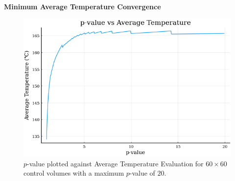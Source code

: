 \documentclass[final]{beamer}
\begin{document}
\begin{frame}{\textbf{Minimum Average Temperature Convergence}}
	\begin{figure}
		\centering
		\includegraphics[width=0.9\linewidth]{60x60-p_vs_T.png}
		\caption[$p$-value vs. $T_{av}$]{$p$-value plotted against Average Temperature Evaluation for $60\times 60$ control volumes with a maximum $p$-value of $20$.}
		\label{fig:p-vs-T}
	\end{figure}
\end{frame}
\end{document}
